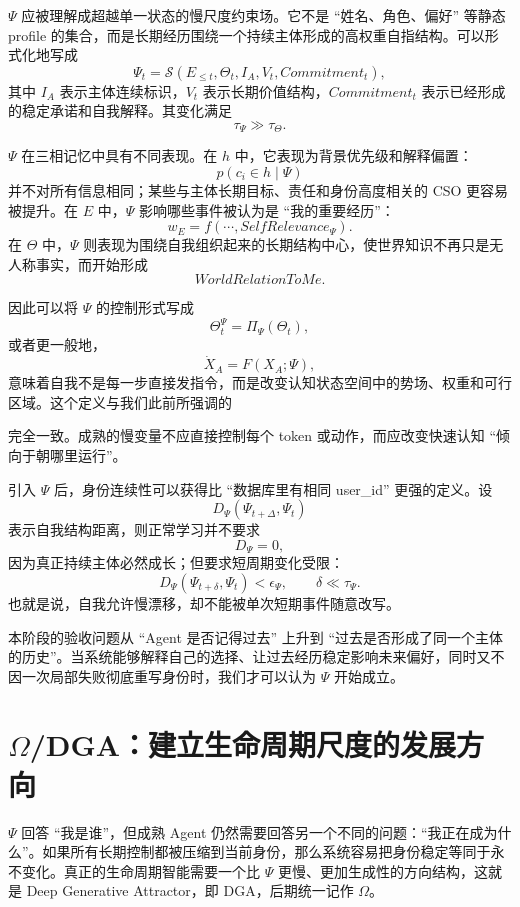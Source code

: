 $\Psi$ 应被理解成超越单一状态的慢尺度约束场。它不是 ``姓名、角色、偏好'' 等静态 profile 的集合，而是长期经历围绕一个持续主体形成的高权重自指结构。可以形式化地写成
\[
\Psi_t
=
\mathcal S(
E_{\le t},
\Theta_t,
I_A,
V_t,
Commitment_t
),
\]
其中 $I_A$ 表示主体连续标识，$V_t$ 表示长期价值结构，$Commitment_t$ 表示已经形成的稳定承诺和自我解释。其变化满足
\[
\tau_\Psi\gg\tau_\Theta.
\]

$\Psi$ 在三相记忆中具有不同表现。在 $h$ 中，它表现为背景优先级和解释偏置：
\[
p(c_i\in h\mid \Psi)
\]
并不对所有信息相同；某些与主体长期目标、责任和身份高度相关的 CSO 更容易被提升。在 $E$ 中，$\Psi$ 影响哪些事件被认为是 ``我的重要经历''：
\[
w_E
=
f(\cdots,SelfRelevance_\Psi).
\]
在 $\Theta$ 中，$\Psi$ 则表现为围绕自我组织起来的长期结构中心，使世界知识不再只是无人称事实，而开始形成
\[
WorldRelationToMe.
\]

因此可以将 $\Psi$ 的控制形式写成
\[
\Theta_t^\Psi
=
\Pi_\Psi(\Theta_t),
\]
或者更一般地，
\[
\dot X_A
=
F(X_A;\Psi),
\]
意味着自我不是每一步直接发指令，而是改变认知状态空间中的势场、权重和可行区域。这个定义与我们此前所强调的
\begin{statementbox}
\centering
{}
\end{statementbox}
完全一致。成熟的慢变量不应直接控制每个 token 或动作，而应改变快速认知 ``倾向于朝哪里运行''。

引入 $\Psi$ 后，身份连续性可以获得比 ``数据库里有相同 user\_id'' 更强的定义。设
\[
D_\Psi(\Psi_{t+\Delta},\Psi_t)
\]
表示自我结构距离，则正常学习并不要求
\[
D_\Psi=0,
\]
因为真正持续主体必然成长；但要求短周期变化受限：
\[
D_\Psi(\Psi_{t+\delta},\Psi_t)
<
\epsilon_\Psi,
\qquad
\delta\ll\tau_\Psi.
\]
也就是说，自我允许慢漂移，却不能被单次短期事件随意改写。

本阶段的验收问题从 ``Agent 是否记得过去'' 上升到 ``过去是否形成了同一个主体的历史''。当系统能够解释自己的选择、让过去经历稳定影响未来偏好，同时又不因一次局部失败彻底重写身份时，我们才可以认为 $\Psi$ 开始成立。

\section{$\Omega$/DGA：建立生命周期尺度的发展方向}

$\Psi$ 回答 ``我是谁''，但成熟 Agent 仍然需要回答另一个不同的问题：``我正在成为什么''。如果所有长期控制都被压缩到当前身份，那么系统容易把身份稳定等同于永不变化。真正的生命周期智能需要一个比 $\Psi$ 更慢、更加生成性的方向结构，这就是 Deep Generative Attractor，即 DGA，后期统一记作 $\Omega$。

